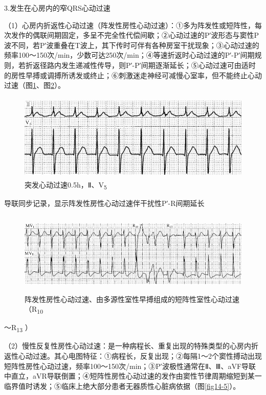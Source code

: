 3.发生在心房内的窄QRS心动过速

（1）心房内折返性心动过速（阵发性房性心动过速）：①多为阵发性或短阵性，每次发作的偶联间期固定，多呈不完全性代偿间歇；②心动过速的P′波形态与窦性P波不同，若P′波重叠在T波上，其下传时可伴有各种房室干扰现象；③心动过速的频率100～150次/min，少数可达250次/min；④等速折返时心动过速的P′-P′间期规则，若折返径路内发生递减性传导，则P′-P′间期逐渐延长；⑤心动过速可由适时的房性早搏或调搏所诱发或终止；⑥刺激迷走神经可减慢心室率，但不能终止心动过速（图\ref{fig32-3}、图\ref{fig32-4}）。

\begin{figure}[!htbp]
 \centering
 \includegraphics[width=4.79167in,height=1.63542in]{./images/Image00519.jpg}
 \captionsetup{justification=centering}
 \caption{突发心动过速0.5h，Ⅱ、V\textsubscript{5}}
 \label{fig32-3}
  \end{figure} 
导联同步记录，显示阵发性房性心动过速伴干扰性P′-R间期延长

\begin{figure}[!htbp]
 \centering
 \includegraphics[width=5.58333in,height=1.55208in]{./images/Image00520.jpg}
 \captionsetup{justification=centering}
 \caption{阵发性房性心动过速、由多源性室性早搏组成的短阵性室性心动过速（R\textsubscript{10}}
 \label{fig32-4}
  \end{figure} 
～R\textsubscript{13} ）

（2）慢性反复性房性心动过速：是一种病程长、重复出现的特殊类型的心房内折返性心动过速。其心电图特征：①病程长，反复出现；②每隔1～2个窦性搏动出现短阵性房性心动过速，频率100～150次/min；③P′波极性通常在Ⅱ、Ⅲ、aVF导联中直立，aVR导联倒置；④短阵性房性心动过速的发作由窦性节律周期缩短到某一临界值时诱发；⑤临床上绝大部分患者无器质性心脏病依据（图\ref{fig14-5}）。

